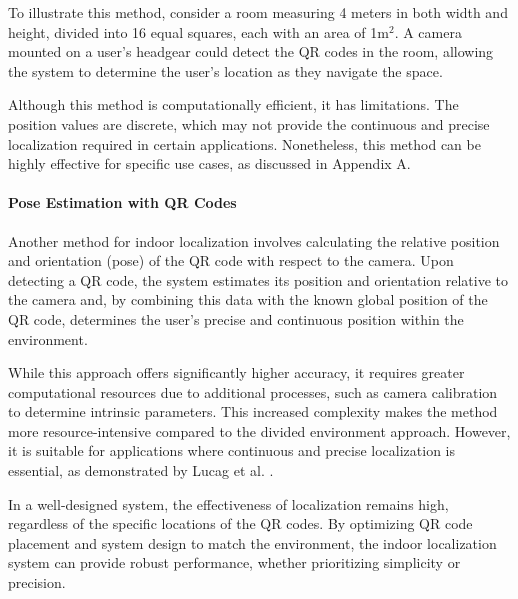 To illustrate this method, consider a room measuring 4 meters in both width and height, divided into 16 equal squares, each with an area of 1m$^2$. A camera mounted on a user’s headgear could detect the QR codes in the room, allowing the system to determine the user’s location as they navigate the space.

Although this method is computationally efficient, it has limitations. The position values are discrete, which may not provide the continuous and precise localization required in certain applications. Nonetheless, this method can be highly effective for specific use cases, as discussed in Appendix A.


\paragraph{Pose Estimation with QR Codes}

Another method for indoor localization involves calculating the relative position and orientation (pose) of the QR code with respect to the camera. Upon detecting a QR code, the system estimates its position and orientation relative to the camera and, by combining this data with the known global position of the QR code, determines the user’s precise and continuous position within the environment.

While this approach offers significantly higher accuracy, it requires greater computational resources due to additional processes, such as camera calibration to determine intrinsic parameters. This increased complexity makes the method more resource-intensive compared to the divided environment approach. However, it is suitable for applications where continuous and precise localization is essential, as demonstrated by Lucag et al. \cite{Lucag2017}.



In a well-designed system, the effectiveness of localization remains high, regardless of the specific locations of the QR codes. By optimizing QR code placement and system design to match the environment, the indoor localization system can provide robust performance, whether prioritizing simplicity or precision.